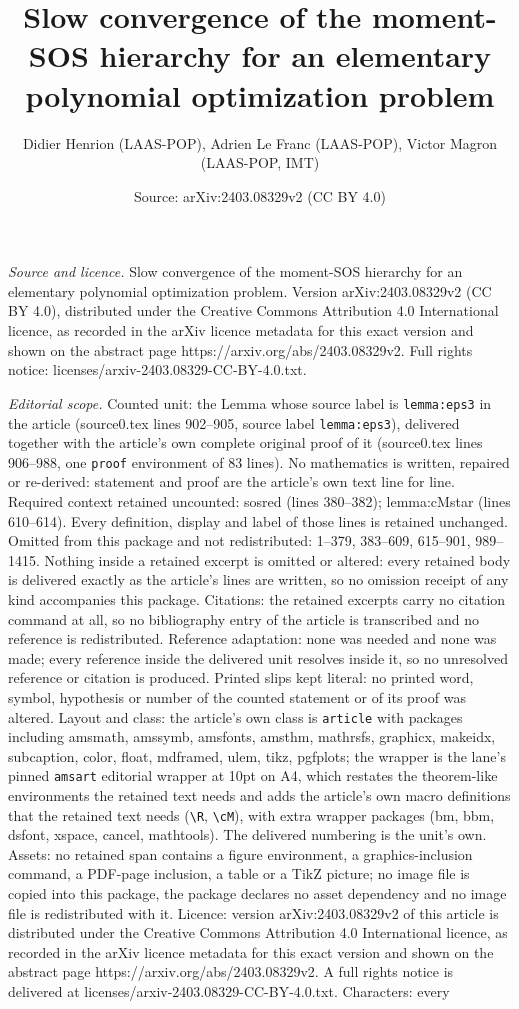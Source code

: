 \documentclass[10pt,a4paper]{amsart}
\title[Slow convergence of the moment-SOS hierarchy for an elementa]{Slow convergence of the moment-SOS hierarchy for an elementary polynomial optimization problem}
\author{Didier Henrion (LAAS-POP), Adrien Le Franc (LAAS-POP), Victor Magron (LAAS-POP, IMT)}
\date{Source: arXiv:2403.08329v2 (CC BY 4.0)}
\begin{document}
\maketitle

\noindent\emph{Source and licence.} Slow convergence of the moment-SOS hierarchy for an elementary polynomial optimization problem. Version arXiv:2403.08329v2 (CC BY 4.0), distributed under the Creative Commons Attribution 4.0 International licence, as recorded in the arXiv licence metadata for this exact version and shown on the abstract page https://arxiv.org/abs/2403.08329v2. Full rights notice: licenses/arxiv-2403.08329-CC-BY-4.0.txt.\par\smallskip

\noindent\textit{Editorial scope.} Counted unit: the Lemma whose source label is \texttt{lemma:eps3} in the article (source0.tex lines 902--905, source label \texttt{lemma:eps3}), delivered together with the article's own complete original proof of it (source0.tex lines 906--988, one \texttt{proof} environment of 83 lines). No mathematics is written, repaired or re-derived: statement and proof are the article's own text line for line. Required context retained uncounted: sosred (lines 380--382); lemma:cMstar (lines 610--614). Every definition, display and label of those lines is retained unchanged. Omitted from this package and not redistributed: 1--379, 383--609, 615--901, 989--1415. Nothing inside a retained excerpt is omitted or altered: every retained body is delivered exactly as the article's lines are written, so no omission receipt of any kind accompanies this package. Citations: the retained excerpts carry no citation command at all, so no bibliography entry of the article is transcribed and no reference is redistributed. Reference adaptation: none was needed and none was made; every reference inside the delivered unit resolves inside it, so no unresolved reference or citation is produced. Printed slips kept literal: no printed word, symbol, hypothesis or number of the counted statement or of its proof was altered. Layout and class: the article's own class is \texttt{article} with packages including amsmath, amssymb, amsfonts, amsthm, mathrsfs, graphicx, makeidx, subcaption, color, float, mdframed, ulem, tikz, pgfplots; the wrapper is the lane's pinned \texttt{amsart} editorial wrapper at 10pt on A4, which restates the theorem-like environments the retained text needs and adds the article's own macro definitions that the retained text needs (\texttt{\textbackslash R}, \texttt{\textbackslash cM}), with extra wrapper packages (bm, bbm, dsfont, xspace, cancel, mathtools). The delivered numbering is the unit's own. Assets: no retained span contains a figure environment, a graphics-inclusion command, a PDF-page inclusion, a table or a TikZ picture; no image file is copied into this package, the package declares no asset dependency and no image file is redistributed with it. Licence: version arXiv:2403.08329v2 of this article is distributed under the Creative Commons Attribution 4.0 International licence, as recorded in the arXiv licence metadata for this exact version and shown on the abstract page https://arxiv.org/abs/2403.08329v2. A full rights notice is delivered at licenses/arxiv-2403.08329-CC-BY-4.0.txt. Characters: every 
\end{document}
